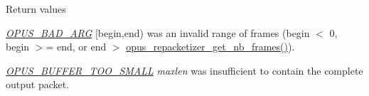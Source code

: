 \begin{DoxyRetVals}{Return values}
\item[{\em \hyperlink{group__opus__errorcodes_gaf2d43e479455a1a3b6874e5faf4e827d}{OPUS\_\-BAD\_\-ARG}}]{\ttfamily \mbox{[}begin,end)} was an invalid range of frames (begin $<$ 0, begin $>$= end, or end $>$ \hyperlink{group__opus__repacketizer_ga2cad98d04458aafdf6bb9f22f34ea7c0}{opus\_\-repacketizer\_\-get\_\-nb\_\-frames()}). \item[{\em \hyperlink{group__opus__errorcodes_gacd897c05563ec04a67d8e92ba29f3d4f}{OPUS\_\-BUFFER\_\-TOO\_\-SMALL}}]{\itshape maxlen\/} was insufficient to contain the complete output packet. \end{DoxyRetVals}
